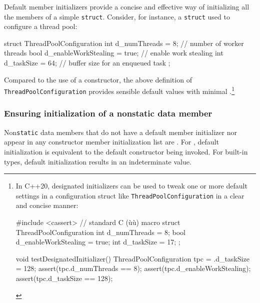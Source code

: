 Default member initializers provide a concise and effective way of
initializing all the members of a simple \lstinline!struct!. Consider, for
instance, a \lstinline!struct! used to configure a thread pool:

\begin{emcppslisting}
struct ThreadPoolConfiguration
{
    int  d_numThreads         = 8;     // number of worker threads
    bool d_enableWorkStealing = true;  // enable work stealing
    int  d_taskSize           = 64;    // buffer size for an enqueued task
};
\end{emcppslisting}
    
\newpage  %
Compared to the use of a constructor, the above definition of
\lstinline!ThreadPoolConfiguration! provides sensible default values with
minimal .{\cprotect\footnote{In C++20, designated
initializers can be used to tweak one or more default settings in a
configuration struct like \lstinline!ThreadPoolConfiguration! in a clear
and concise manner:

\begin{emcppshiddenlisting}[emcppsbatch=e1]
#include <cassert>  // standard C (ù{}ù) macro
struct ThreadPoolConfiguration {
    int d_numThreads = 8;
    bool d_enableWorkStealing = true;
    int d_taskSize = 17;
};
\end{emcppshiddenlisting}
\begin{emcppslisting}[emcppsbatch=e1,emcppsstandards={c++20},style=footcode]
void testDesignatedInitializer()
{
    ThreadPoolConfiguration tpc = {.d_taskSize = 128};
    assert(tpc.d_numThreads == 8);
    assert(tpc.d_enableWorkStealing);
    assert(tpc.d_taskSize == 128);
}
\end{emcppslisting}
      }}

\subsubsection[Ensuring initialization of a non\lstinline!static! data member]{Ensuring initialization of a non{\SubsubsecCode static} data member}\label{ensuring-initialization-of-a-nonstatic-data-member}

Non\lstinline!static! data members that do not have a default member
initializer nor appear in any constructor member initialization list are
. For , default
initialization is equivalent to the default constructor being invoked.
For built-in types, default initialization results in an indeterminate
value.

